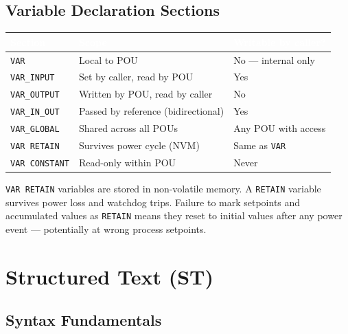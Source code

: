 \documentclass[12pt,twoside,openright]{memoir}
\begin{document}
\section{Variable Declaration Sections}

\begin{center}
\begin{tabular}{L{3cm} L{4.5cm} L{4cm}}
\toprule
{} \textcolor{white}{\textbf{Section}} & \textcolor{white}{\textbf{Scope}} & \textcolor{white}{\textbf{Writable by caller?}} \\
\midrule
{}\texttt{VAR}         & Local to POU             & No --- internal only \\
\texttt{VAR\_INPUT}   & Set by caller, read by POU & Yes \\
\texttt{VAR\_OUTPUT} & Written by POU, read by caller & No \\
\texttt{VAR\_IN\_OUT} & Passed by reference (bidirectional) & Yes \\
\texttt{VAR\_GLOBAL} & Shared across all POUs   & Any POU with access \\
\texttt{VAR RETAIN}  & Survives power cycle (NVM)  & Same as \texttt{VAR} \\
\texttt{VAR CONSTANT}& Read-only within POU     & Never \\
\bottomrule
\end{tabular}
\end{center}

\begin{warningbox}
\texttt{VAR RETAIN} variables are stored in non-volatile memory. A \texttt{RETAIN} variable survives power loss and watchdog trips. Failure to mark setpoints and accumulated values as \texttt{RETAIN} means they reset to initial values after any power event --- potentially at wrong process setpoints.
\end{warningbox}

\chapter{Structured Text (ST)}

\section{Syntax Fundamentals}
\end{document}
